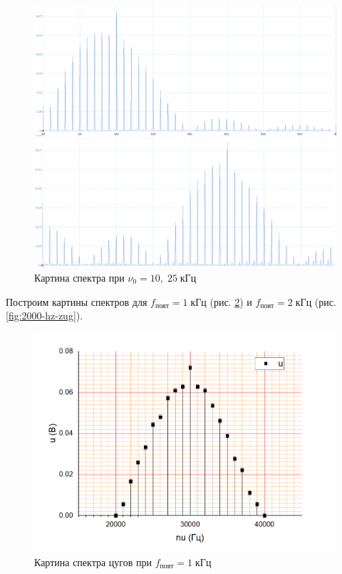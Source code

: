 \documentclass[a4paper]{article}
\begin{document}
\begin{figure}[tbp]
	\centering
	\begin{minipage}{0.8\linewidth}
		\centering
		\includegraphics[width=1\linewidth]{Фото/Скрины/3.17(10)}
	\end{minipage}
	\vspace{20pt}	
	
	\begin{minipage}{0.8\linewidth}
		\centering
		\includegraphics[width=1\linewidth]{Фото/Скрины/3.17(25)}
	\end{minipage}
	\vspace{20pt}
	\label{fig:specr}
	\caption{Картина спектра при $ \nu_0 = 10, \; 25 \;  кГц $}
\end{figure}

Построим картины спектров для $ f_{повт}  = 1\; кГц$ (рис. \ref{fig:1000-hz-zug}) и $ f_{повт}  = 2\; кГц $ (рис. \ref{fig:2000-hz-zug}).

\begin{figure}[p]
	\centering
	\includegraphics[width=0.8\linewidth]{"1000 hz zug"}
	\caption{Картина спектра цугов при $f_{повт} = 1\; кГц$}
	\label{fig:1000-hz-zug}
\end{figure}
\end{document}
